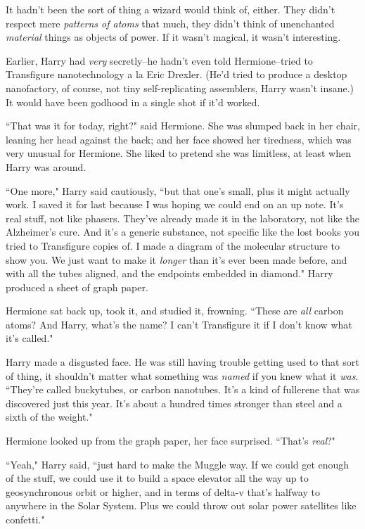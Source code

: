 It hadn't been the sort of thing a wizard would think of, either. They didn't respect mere \emph{patterns of atoms} that much, they didn't think of unenchanted \emph{material} things as objects of power. If it wasn't magical, it wasn't interesting.

Earlier, Harry had \emph{very} secretly\---he hadn't even told Hermione\---tried to Transfigure nanotechnology a la Eric Drexler. (He'd tried to produce a desktop nanofactory, of course, not tiny self-replicating assemblers, Harry wasn't insane.) It would have been godhood in a single shot if it'd worked.

``That was it for today, right?" said Hermione. She was slumped back in her chair, leaning her head against the back; and her face showed her tiredness, which was very unusual for Hermione. She liked to pretend she was limitless, at least when Harry was around.

``One more," Harry said cautiously, ``but that one's small, plus it might actually work. I saved it for last because I was hoping we could end on an up note. It's real stuff, not like phasers. They've already made it in the laboratory, not like the Alzheimer's cure. And it's a generic substance, not specific like the lost books you tried to Transfigure copies of. I made a diagram of the molecular structure to show you. We just want to make it \emph{longer} than it's ever been made before, and with all the tubes aligned, and the endpoints embedded in diamond." Harry produced a sheet of graph paper.

Hermione sat back up, took it, and studied it, frowning. ``These are \emph{all} carbon atoms? And Harry, what's the name? I can't Transfigure it if I don't know what it's called."

Harry made a disgusted face. He was still having trouble getting used to that sort of thing, it shouldn't matter what something was \emph{named} if you knew what it \emph{was}. ``They're called buckytubes, or carbon nanotubes. It's a kind of fullerene that was discovered just this year. It's about a hundred times stronger than steel and a sixth of the weight."

Hermione looked up from the graph paper, her face surprised. ``That's \emph{real}?"

``Yeah," Harry said, ``just hard to make the Muggle way. If we could get enough of the stuff, we could use it to build a space elevator all the way up to geosynchronous orbit or higher, and in terms of delta-v that's halfway to anywhere in the Solar System. Plus we could throw out solar power satellites like confetti."

